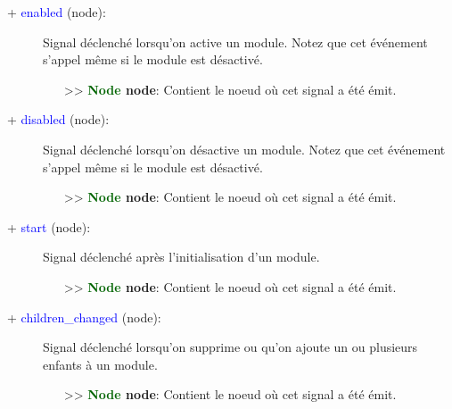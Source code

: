 \documentclass[a4paper, 11pt]{article}
\begin{document}
	\begin{description}
		\item [+ \textcolor{blue}{enabled} (node):] Signal déclenché lorsqu'on active un module. Notez que
		cet événement s'appel même si le module est désactivé.
		\begin{itemize}
			\item [>> \textbf{\textcolor{darkgreen}{Node} node}:] Contient le noeud où cet signal a été 
			émit.\\
		\end{itemize}
	\end{description}
	\begin{description}
		\item [+ \textcolor{blue}{disabled} (node):] Signal déclenché lorsqu'on désactive un module. Notez
		que cet événement \\s'appel même si le module est désactivé.
		\begin{itemize}
			\item [>> \textbf{\textcolor{darkgreen}{Node} node}:] Contient le noeud où cet signal a été 
			émit.\\
		\end{itemize}
	\end{description}
	\begin{description}
		\item [+ \textcolor{blue}{start} (node):] Signal déclenché après l'initialisation d'un module.
		\begin{itemize}
			\item [>> \textbf{\textcolor{darkgreen}{Node} node}:] Contient le noeud où cet signal a été 
			émit.\\
		\end{itemize}
	\end{description}
	\begin{description}
		\item [+ \textcolor{blue}{children\_changed} (node):] Signal déclenché lorsqu'on supprime ou qu'on 
		ajoute un ou plusieurs enfants à un module.
		\begin{itemize}
			\item [>> \textbf{\textcolor{darkgreen}{Node} node}:] Contient le noeud où cet signal a été 
			émit.\\
		\end{itemize}
	\end{description}
\end{document}
